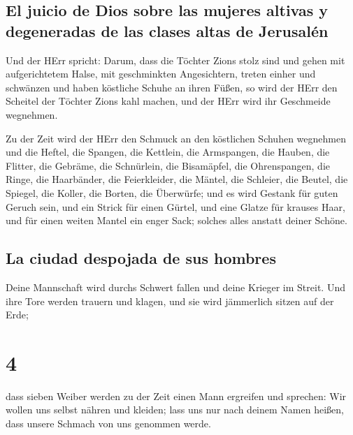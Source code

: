 \hypertarget{el-juicio-de-dios-sobre-las-mujeres-altivas-y-degeneradas-de-las-clases-altas-de-jerusaluxe9n}{%
\subsection{El juicio de Dios sobre las mujeres altivas y degeneradas de
las clases altas de
Jerusalén}\label{el-juicio-de-dios-sobre-las-mujeres-altivas-y-degeneradas-de-las-clases-altas-de-jerusaluxe9n}}

 Und der HErr spricht: Darum, dass die Töchter Zions
stolz sind und gehen mit aufgerichtetem Halse, mit geschminkten
Angesichtern, treten einher und schwänzen und haben köstliche Schuhe an
ihren Füßen,  so wird der HErr den Scheitel der Töchter
Zions kahl machen, und der HErr wird ihr Geschmeide wegnehmen.

 Zu der Zeit wird der HErr den Schmuck an den köstlichen
Schuhen wegnehmen und die Heftel, die Spangen,  die
Kettlein, die Armspangen, die Hauben,  die Flitter, die
Gebräme, die Schnürlein, die Bisamäpfel, die Ohrenspangen,
 die Ringe, die Haarbänder,  die
Feierkleider, die Mäntel, die Schleier, die Beutel,  die
Spiegel, die Koller, die Borten, die Überwürfe;  und es
wird Gestank für guten Geruch sein, und ein Strick für einen Gürtel, und
eine Glatze für krauses Haar, und für einen weiten Mantel ein enger
Sack; solches alles anstatt deiner Schöne.

\hypertarget{la-ciudad-despojada-de-sus-hombres}{%
\subsection{La ciudad despojada de sus
hombres}\label{la-ciudad-despojada-de-sus-hombres}}

 Deine Mannschaft wird durchs Schwert fallen und deine
Krieger im Streit.  Und ihre Tore werden trauern und
klagen, und sie wird jämmerlich sitzen auf der Erde;

\hypertarget{section-3}{%
\section{4}\label{section-3}}

 dass sieben Weiber werden zu der Zeit einen Mann
ergreifen und sprechen: Wir wollen uns selbst nähren und kleiden; lass
uns nur nach deinem Namen heißen, dass unsere Schmach von uns genommen
werde.

